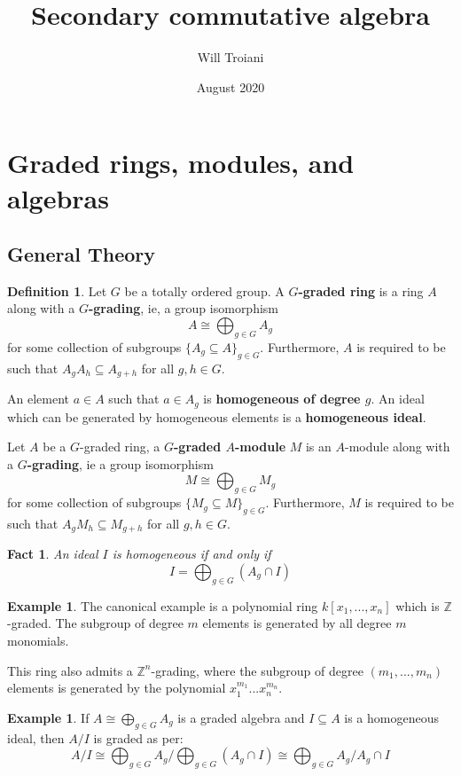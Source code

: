 \documentclass[12pt]{article}
\title{Secondary commutative algebra}
\author{Will Troiani}
\date{August 2020}
\theoremstyle{plain}
\newtheorem{fact}[thm]{Fact}
\theoremstyle{definition}
\newtheorem{defn}[thm]{Definition} %
\newtheorem{example}[thm]{Example}
\newcommand{\bb}[1]{\mathbb{#1}}
\begin{document}
	\maketitle
	\tableofcontents

\section{Graded rings, modules, and algebras}\label{Sec:Graded}
\subsection{General Theory}
\begin{defn}
	Let $G$ be a totally ordered group. A \textbf{$G$-graded ring} is a ring $A$ along with a \textbf{$G$-grading}, ie, a group isomorphism
	\begin{equation}
		A \cong \bigoplus_{g \in G}A_g
	\end{equation}
	for some collection of subgroups $\lbrace A_g \subseteq A \rbrace_{g \in G}$. Furthermore, $A$ is required to be such that $A_gA_h \subseteq A_{g + h}$ for all $g,h \in G$.
	
	An element $a \in A$ such that $a \in A_g$ is \textbf{homogeneous of degree $g$}. An ideal which can be generated by homogeneous elements is a \textbf{homogeneous ideal}.
	
	Let $A$ be a $G$-graded ring, a \textbf{$G$-graded $A$-module} $M$ is an $A$-module along with a \textbf{$G$-grading}, ie a group isomorphism
	\begin{equation}
		M \cong \bigoplus_{g \in G} M_g
	\end{equation}
	for some collection of subgroups $\lbrace M_g \subseteq M\rbrace_{g \in G}$. Furthermore, $M$ is required to be such that $A_gM_h \subseteq M_{g + h}$ for all $g,h \in G$.
\end{defn}
\begin{fact}
	An ideal $I$ is homogeneous if and only if
	\begin{equation}
		I = \bigoplus_{g \in G}(A_g \cap I)
	\end{equation}
\end{fact}
\begin{example}
	The canonical example is a polynomial ring $k[x_1,...,x_n]$ which is $\bb{Z}$-graded. The subgroup of degree $m$ elements is generated by all degree $m$ monomials.
	
	This ring also admits a $\bb{Z}^n$-grading, where the subgroup of degree $(m_1,...,m_n)$ elements is generated by the polynomial $x^{m_1}_1...x^{m_n}_n$.
\end{example}
\begin{example}\label{ex:quotient_of_homog_by_homog}
	If $A \cong \bigoplus_{g \in G}A_g$ is a graded algebra and $I \subseteq A$ is a homogeneous ideal, then $A/I$ is graded as per:
	\begin{equation}
		A/I \cong \bigoplus_{g \in G}A_g/\bigoplus_{g \in G}(A_g \cap I) \cong \bigoplus_{g \in G}A_g/A_g \cap I
	\end{equation}
\end{example}
\end{document}
